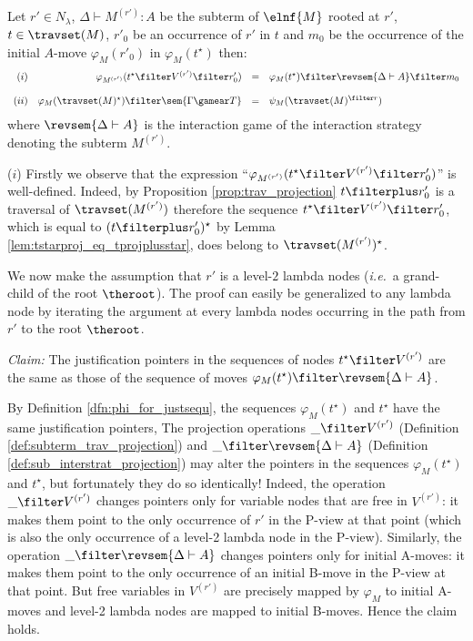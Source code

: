 \begin{lemma}
\label{lem:varphi_proj} Let $r'\in N_\lambda$, $\Delta \vdash
M^{(r')} : A$ be the subterm of $\elnf{M}$ rooted at $r'$,
$t\in\travset(M)$, $r'_0$ be an occurrence of $r'$ in $t$ and $m_0$
be the occurrence of the initial $A$-move $\varphi_M(r'_0)$ in
$\varphi_M(t^\star)$ then:
$$\begin{array}{rrcl}
(i)& \varphi_{M^{(r')}}(t^\star \filter V^{(r')} \filter r'_0) &=& \varphi_M(t^\star) \filter \revsem{\Delta \vdash A} \filter m_0 \\ \\
(ii) & \varphi_M(\travset(M)^\star) \filter \sem{\Gamma \gamear T} &=& \psi_M(\travset(M)^{\filter r})
\end{array}
$$
where $\revsem{\Delta \vdash A }$ is the interaction game of the interaction strategy denoting the subterm $M^{(r')}$.
\end{lemma}
\proof ($i$) Firstly we observe that the expression ``$\varphi_{M^{(r')}}(t^\star \filter V^{(r')} \filter r'_0)$'' is well-defined. Indeed, by Proposition \ref{prop:trav_projection} $t\filterplus r'_0$ is a traversal of $\travset(M^{(r')})$ therefore
the sequence $t^\star \filter V^{(r')} \filter r'_0$, which is equal to $(t\filterplus r'_0)^\star$ by Lemma \ref{lem:tstarproj_eq_tprojplusstar},
does belong to $\travset(M^{(r')})^\star$.

We now make the assumption that $r'$ is a level-$2$ lambda nodes ({\it i.e.}\ a grand-child of the root $\theroot$). The proof can easily
be generalized to any lambda node by iterating the argument at every lambda nodes occurring in the path from $r'$ to the root $\theroot$.


\emph{Claim:} The justification pointers in the sequences of nodes $t^\star \filter V^{(r')}$ are the same as those
of the sequence of moves $\varphi_M(t^\star) \filter \revsem{\Delta \vdash A }$.

By Definition \ref{dfn:phi_for_justsequ}, the sequences $\varphi_M(t^\star)$ and $t^\star$ have the same justification pointers,
The projection operations $\_ \filter V^{(r')}$ (Definition \ref{def:subterm_trav_projection})
and $\_ \filter \revsem{\Delta \vdash A}$ (Definition \ref{def:sub_interstrat_projection}) may alter the
pointers in the sequences $\varphi_M(t^\star)$ and $t^\star$, but fortunately they do so identically!
Indeed, the operation $\_ \filter V^{(r')}$ changes pointers only for variable nodes that are free in $V^{(r')}$: it makes them point to
the only occurrence of $r'$ in the P-view at that point (which is also the only occurrence of a level-2 lambda node in the P-view).
Similarly, the operation $\_ \filter \revsem{\Delta \vdash A}$ changes pointers only for initial A-moves: it makes them point to
the only occurrence of an initial B-move in  the P-view at that point.
But free variables in $V^{(r')}$ are precisely mapped by $\varphi_M$ to initial A-moves and level-2 lambda nodes are mapped to
initial B-moves. Hence the claim holds.

